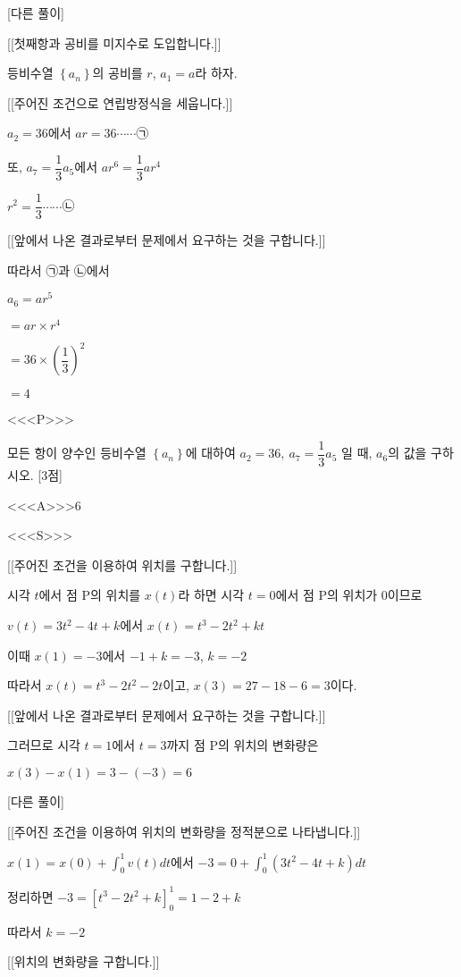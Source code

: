 \documentclass{oblivoir}
\begin{document}
[다른 풀이]

[[첫째항과 공비를 미지수로 도입합니다.]]

등비수열 $\left\{a_{n}\right\}$의 공비를 $r$, $a_{1}=a$라 하자.

[[주어진 조건으로 연립방정식을 세웁니다.]]

$a_{2}=36$에서 $ar=36\cdots\cdots$㉠

또, $a_{7}=\dfrac{1}{3}a_{5}$에서 $ar^{6}=\dfrac{1}{3}ar^{4}$

$r^{2}=\dfrac{1}{3}\cdots\cdots$㉡

[[앞에서 나온 결과로부터 문제에서 요구하는 것을 구합니다.]]

따라서 ㉠과 ㉡에서

$a_{6}$$=ar^{5}$

$=ar\times r^{4}$

$=36\times\left(\dfrac{1}{3}\right)^{2}$

$=4$

<<<P>>>

모든 항이 양수인 등비수열 $\left\{a_{n}\right\}$에 대하여
$a_{2}= 36 ,\: a_{7}=\dfrac{1}{3}a_{5}$
일 때, $a_{6}$의 값을 구하시오. [3점]

<<<A>>>$6$

<<<S>>>

[[주어진 조건을 이용하여 위치를 구합니다.]]

시각 $t$에서 점 $\mathrm{P}$의 위치를 $x(t)$라 하면 시각 $t=0$에서 점 $\mathrm{P}$의 위치가 $0$이므로

$v(t)=3t^{2}-4t+k$에서 $x(t)=t^{3}-2t^{2}+kt$

이때 $x(1)= -3$에서 $-1+k = -3$, $k= -2$

따라서 $x(t)=t^{3}-2t^{2}-2t$이고, $x(3)=27-18-6=3$이다.

[[앞에서 나온 결과로부터 문제에서 요구하는 것을 구합니다.]]

그러므로 시각 $t=1$에서 $t=3$까지 점 $\mathrm{P}$의 위치의 변화량은

$x(3)-x(1)=3-(-3)=6$

[다른 풀이]

[[주어진 조건을 이용하여 위치의 변화량을 정적분으로 나타냅니다.]]

$x(1)=x(0)+\displaystyle\int_{0}^{1}v(t)dt$에서 $-3=0+\displaystyle\int_{0}^{1}(3t^{2}-4t+k)dt$

정리하면 $-3=\left[t^{3}-2t^{2}+k\right]_{0}^{1}=1-2+k$

따라서 $k=-2$

[[위치의 변화량을 구합니다.]]
\end{document}

